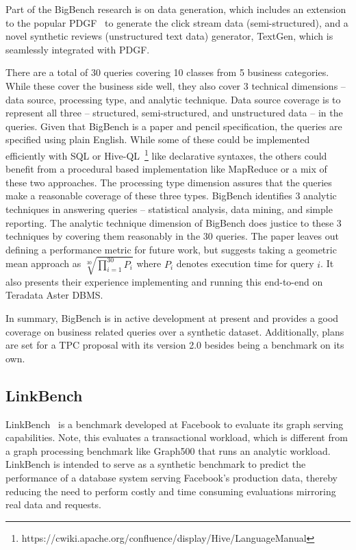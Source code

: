 Part of the BigBench research is on data generation, which includes an extension to the popular \ac{PDGF}~\cite{pdgf} to generate the click stream data (semi-structured), and a novel synthetic reviews (unstructured text data) generator, TextGen, which is seamlessly integrated with \ac{PDGF}. 

There are a total of 30 queries covering 10 classes from 5 business categories. While these cover the business side well, they also cover 3 technical dimensions – data source, processing type, and analytic technique. Data source coverage is to represent all three – structured, semi-structured, and unstructured data – in the queries. Given that BigBench is a paper and pencil specification, the queries are specified using plain English. While some of these could be implemented efficiently with \ac{SQL} or Hive-QL~\footnote{https://cwiki.apache.org/confluence/display/Hive/LanguageManual} like declarative syntaxes, the others could benefit from a procedural based implementation like MapReduce or a mix of these two approaches. The processing type dimension assures that the queries make a reasonable coverage of these three types. BigBench identifies 3 analytic techniques in answering queries – statistical analysis, data mining, and simple reporting. The analytic technique dimension of BigBench does justice to these 3 techniques by covering them reasonably in the 30 queries. The paper leaves out defining a performance metric for future work, but suggests taking a geometric mean approach as $\sqrt[30]{\prod_{i=1}^{30}P_i}$ where $P_i$ denotes execution time for query $i$. It also presents their experience implementing and running this end-to-end on Teradata Aster \ac{DBMS}. 

In summary, BigBench is in active development at present and provides a good coverage on business related queries over a synthetic dataset. Additionally, plans are set for a \ac{TPC} proposal with its version 2.0 besides being a benchmark on its own. 

\subsection{LinkBench}
LinkBench~\cite{linkbench} is a benchmark developed at Facebook to evaluate its graph serving capabilities. Note, this evaluates a transactional workload, which is different from a graph processing benchmark like Graph500 that runs an analytic workload. LinkBench is intended to serve as a synthetic benchmark to predict the performance of a database system serving Facebook’s production data, thereby reducing the need to perform costly and time consuming evaluations mirroring real data and requests.

